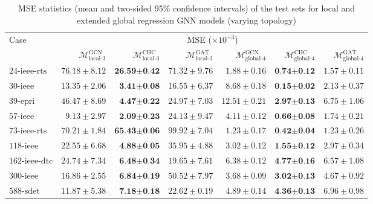 \documentclass[journal]{IEEEtran}
\begin{document}
\begin{table*}[!ht]
\small
\caption{MSE statistics (mean and two-sided 95\% confidence intervals) of the test sets for local and extended global regression GNN models (varying topology)}
\label{tab:error_reg_local_contingency}
\def\na{---}
\centering
    \begin{tabular}{lrrr|rrr}
    \toprule
    \multirow{2}{*}{Case} & \multicolumn{6}{c}{MSE ($\times 10^{-3}$)} \\
    \cmidrule(r){2-7}
    & $\mathcal{M}^{\textrm{GCN}}_{\textrm{local-3}}$ & $\mathcal{M}^{\textrm{CHC}}_{\textrm{local-3}}$ & $\mathcal{M}^{\textrm{GAT}}_{\textrm{local-3}}$ & $\mathcal{M}^{\textrm{GCN}}_{\textrm{global-4}}$ & $\mathcal{M}^{\textrm{CHC}}_{\textrm{global-4}}$ & $\mathcal{M}^{\textrm{GAT}}_{\textrm{global-4}}$ \\
    \midrule
    $\textrm{24-ieee-rts}$ & $76.18 \pm 8.12$ & $\textbf{26.59} \boldsymbol{\pm} \textbf{0.42}$ & $71.32 \pm 9.76$ & $1.88 \pm 0.16$ & $\textbf{0.74} \boldsymbol{\pm} \textbf{0.12}$ & $1.57 \pm 0.11$ \\
    $\textrm{30-ieee}$ & $13.35 \pm 2.06$ & $\textbf{3.41} \boldsymbol{\pm} \textbf{0.08}$ & $16.55 \pm 6.37$ & $8.68 \pm 0.18$ & $\textbf{0.15} \boldsymbol{\pm} \textbf{0.02}$ & $2.13 \pm 0.37$ \\
    $\textrm{39-epri}$ & $46.47 \pm 8.69$ & $\textbf{4.47} \boldsymbol{\pm} \textbf{0.22}$ & $24.97 \pm 7.03$ & $12.51 \pm 0.21$ & $\textbf{2.97} \boldsymbol{\pm} \textbf{0.13}$ & $6.75 \pm 1.06$ \\
    $\textrm{57-ieee}$ & $9.13 \pm 2.97$ & $\textbf{2.09} \boldsymbol{\pm} \textbf{0.23}$ & $24.13 \pm 9.47$ & $4.11 \pm 0.12$ & $\textbf{0.66} \boldsymbol{\pm} \textbf{0.08}$ & $1.74 \pm 0.21$ \\
    $\textrm{73-ieee-rts}$ & $70.21 \pm 1.84$ & $\textbf{65.43} \boldsymbol{\pm} \textbf{0.06}$ & $99.92 \pm 7.04$ & $1.23 \pm 0.17$ & $\textbf{0.42} \boldsymbol{\pm} \textbf{0.04}$ & $1.23 \pm 0.26$ \\
    $\textrm{118-ieee}$ & $22.55 \pm 6.68$ & $\textbf{4.88} \boldsymbol{\pm} \textbf{0.05}$ & $35.95 \pm 4.88$ & $3.02 \pm 0.12$ & $\textbf{1.55} \boldsymbol{\pm} \textbf{0.12}$ & $2.97 \pm 0.34$ \\
    $\textrm{162-ieee-dtc}$ & $24.74 \pm 7.34$ & $\textbf{6.48} \boldsymbol{\pm} \textbf{0.34}$ & $19.65 \pm 7.61$ & $6.38 \pm 0.12$ & $\textbf{4.77} \boldsymbol{\pm} \textbf{0.16}$ & $6.57 \pm 1.08$ \\
    $\textrm{300-ieee}$ & $16.86 \pm 2.55$ & $\textbf{6.84} \boldsymbol{\pm} \textbf{0.19}$ & $50.52 \pm 7.97$ & $3.68 \pm 0.09$ & $\textbf{3.02} \boldsymbol{\pm} \textbf{0.13}$ & $4.67 \pm 0.92$ \\
    $\textrm{588-sdet}$ & $11.87 \pm 5.38$ & $\textbf{7.18} \boldsymbol{\pm} \textbf{0.18}$ & $22.62 \pm 0.19$ & $4.89 \pm 0.14$ & $\textbf{4.36} \boldsymbol{\pm} \textbf{0.13}$ & $6.96 \pm 0.98$ \\
    \bottomrule
    \end{tabular}
\end{table*}
\end{document}
